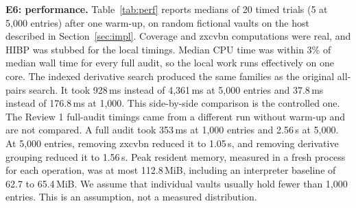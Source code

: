 \documentclass[preprint,12pt]{elsarticle}
\begin{document}
\textbf{E6: performance.} Table~\ref{tab:perf} reports medians of 20 timed trials (5 at 5,000 entries) after one warm-up, on random fictional vaults on the host described in Section~\ref{sec:impl}. Coverage and zxcvbn computations were real, and HIBP was stubbed for the local timings. Median CPU time was within 3\% of median wall time for every full audit, so the local work runs effectively on one core. The indexed derivative search produced the same families as the original all-pairs search. It took 928\,ms instead of 4,361\,ms at 5,000 entries and 37.8\,ms instead of 176.8\,ms at 1,000. This side-by-side comparison is the controlled one. The Review 1 full-audit timings came from a different run without warm-up and are not compared. A full audit took 353\,ms at 1,000 entries and 2.56\,s at 5,000. At 5,000 entries, removing zxcvbn reduced it to 1.05\,s, and removing derivative grouping reduced it to 1.56\,s. Peak resident memory, measured in a fresh process for each operation, was at most 112.8\,MiB, including an interpreter baseline of 62.7 to 65.4\,MiB. We assume that individual vaults usually hold fewer than 1,000 entries. This is an assumption, not a measured distribution.
\end{document}
